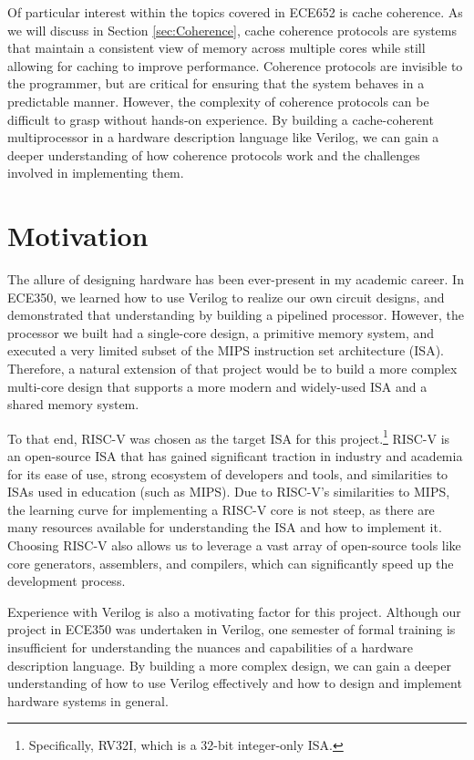 \documentclass[10pt, compsoc]{IEEEtran}
\begin{document}
Of particular interest within the topics covered in ECE652 is cache coherence. As we will discuss in Section \ref{sec:Coherence}, cache coherence protocols are systems that maintain a consistent view of memory across multiple cores while still allowing for caching to improve performance. Coherence protocols are invisible to the programmer, but are critical for ensuring that the system behaves in a predictable manner. However, the complexity of coherence protocols can be difficult to grasp without hands-on experience. By building a cache-coherent multiprocessor in a hardware description language like Verilog, we can gain a deeper understanding of how coherence protocols work and the challenges involved in implementing them.





\section{Motivation}\label{sec:Motivation}

The allure of designing hardware has been ever-present in my academic career. In ECE350, we learned how to use Verilog to realize our own circuit designs, and demonstrated that understanding by building a pipelined processor. However, the processor we built had a single-core design, a primitive memory system, and executed a very limited subset of the MIPS instruction set architecture (ISA). Therefore, a natural extension of that project would be to build a more complex multi-core design that supports a more modern and widely-used ISA and a shared memory system. 



To that end, RISC-V was chosen as the target ISA for this project.\footnote{Specifically, RV32I, which is a 32-bit integer-only ISA.} RISC-V is an open-source ISA that has gained significant traction in industry and academia for its ease of use, strong ecosystem of developers and tools, and similarities to ISAs used in education (such as MIPS). Due to RISC-V's similarities to MIPS, the learning curve for implementing a RISC-V core is not steep, as there are many resources available for understanding the ISA and how to implement it. Choosing RISC-V also allows us to leverage a vast array of open-source tools like core generators, assemblers, and compilers, which can significantly speed up the development process. 



Experience with Verilog is also a motivating factor for this project. Although our project in ECE350 was undertaken in Verilog, one semester of formal training is insufficient for understanding the nuances and capabilities of a hardware description language. By building a more complex design, we can gain a deeper understanding of how to use Verilog effectively and how to design and implement hardware systems in general. 
\end{document}
